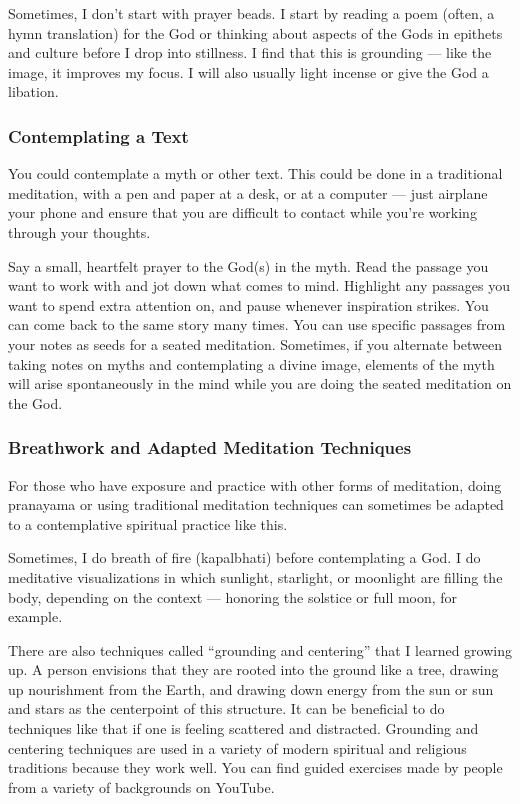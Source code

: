 \documentclass[
]{book}
\begin{document}
Sometimes, I don't start with prayer beads. I start by reading a poem (often, a hymn translation) for the God or thinking about aspects of the Gods in epithets and culture before I drop into stillness. I find that this is grounding --- like the image, it improves my focus. I will also usually light incense or give the God a libation.

\hypertarget{contemplating-a-text}{%
\subsubsection{Contemplating a Text}\label{contemplating-a-text}}

You could contemplate a myth or other text. This could be done in a traditional meditation, with a pen and paper at a desk, or at a computer --- just airplane your phone and ensure that you are difficult to contact while you're working through your thoughts.

Say a small, heartfelt prayer to the God(s) in the myth. Read the passage you want to work with and jot down what comes to mind. Highlight any passages you want to spend extra attention on, and pause whenever inspiration strikes. You can come back to the same story many times. You can use specific passages from your notes as seeds for a seated meditation. Sometimes, if you alternate between taking notes on myths and contemplating a divine image, elements of the myth will arise spontaneously in the mind while you are doing the seated meditation on the God.

\hypertarget{breathwork-and-adapted-meditation-techniques}{%
\subsubsection{Breathwork and Adapted Meditation Techniques}\label{breathwork-and-adapted-meditation-techniques}}

For those who have exposure and practice with other forms of meditation, doing pranayama or using traditional meditation techniques can sometimes be adapted to a contemplative spiritual practice like this.

Sometimes, I do breath of fire (kapalbhati) before contemplating a God. I do meditative visualizations in which sunlight, starlight, or moonlight are filling the body, depending on the context --- honoring the solstice or full moon, for example.

There are also techniques called ``grounding and centering'' that I learned growing up. A person envisions that they are rooted into the ground like a tree, drawing up nourishment from the Earth, and drawing down energy from the sun or sun and stars as the centerpoint of this structure. It can be beneficial to do techniques like that if one is feeling scattered and distracted. Grounding and centering techniques are used in a variety of modern spiritual and religious traditions because they work well. You can find guided exercises made by people from a variety of backgrounds on YouTube.
\end{document}
